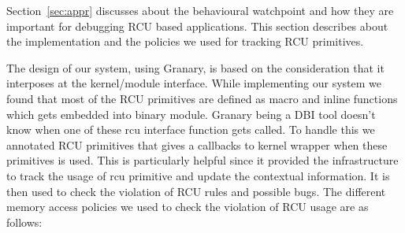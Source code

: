 Section~\ref{sec:appr} discusses about the behavioural watchpoint and how they are important for debugging RCU based applications.
This section describes about the implementation and the policies we used for tracking RCU primitives.

The design of our system, using Granary, is based on the consideration that it interposes at the kernel/module interface. While implementing our system we found that most of the  RCU primitives are defined as macro and inline functions~\cite{PaulEdwardMcKenneyPhD} which gets embedded into binary module. Granary being a DBI tool doesn’t know when one of these rcu interface function gets called. To handle this we annotated RCU primitives that gives a callbacks to kernel wrapper when these primitives is used. This is particularly helpful since it provided the infrastructure to track the usage of rcu primitive and update the contextual information. It is then used to check the violation of RCU rules and possible bugs. The different memory access policies we used to check the violation of RCU usage are as follows:


